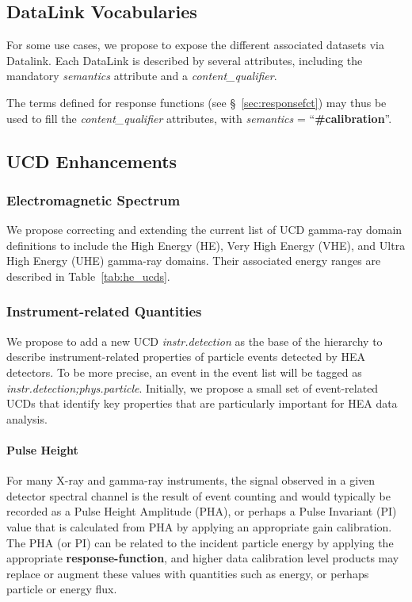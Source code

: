 \documentclass[11pt,a4paper]{ivoa}
\begin{document}
\subsection{DataLink Vocabularies}\label{sec:DLs}

For some use cases, we propose to expose the different associated datasets via Datalink. Each DataLink is described by several attributes, including the mandatory {\em semantics\/} attribute and a {\em content\_qualifier\/}.

The terms defined for response functions (see \S~\ref{sec:responsefct}) may thus be used to fill the {\em content\_qualifier\/} attributes, with {\em semantics\/} = ``{\bf \#calibration}''.


\subsection{UCD Enhancements}\label{sec:UCDs}

\subsubsection{Electromagnetic Spectrum}

We propose correcting and extending the current list of UCD gamma-ray domain definitions to include the High Energy (HE), Very High Energy (VHE), and Ultra High Energy (UHE) gamma-ray domains.  Their associated energy ranges are described in Table~\ref{tab:he_ucds}.

\subsubsection{Instrument-related Quantities}

We propose to add a new UCD {\em instr.detection\/} as the base of the hierarchy to describe instrument-related properties of particle events detected by \gls{HEA} detectors.  To be more precise, an event in the event list will be tagged as {\em instr.detection;phys.particle\/}. Initially, we propose a small set of event-related UCDs that identify key properties that are particularly important for \gls{HEA} data analysis.

\paragraph{Pulse Height}

For many X-ray and gamma-ray instruments, the signal observed in a given detector spectral channel is the result of event counting and would typically be recorded as a Pulse Height Amplitude (PHA), or perhaps a Pulse Invariant (PI) value that is calculated from PHA by applying an appropriate gain calibration.  The PHA (or PI) can be related to the incident particle energy by applying the appropriate {\bf response-function}, and higher data calibration level products may replace or augment these values with quantities such as energy, or perhaps particle or energy flux.
\end{document}
